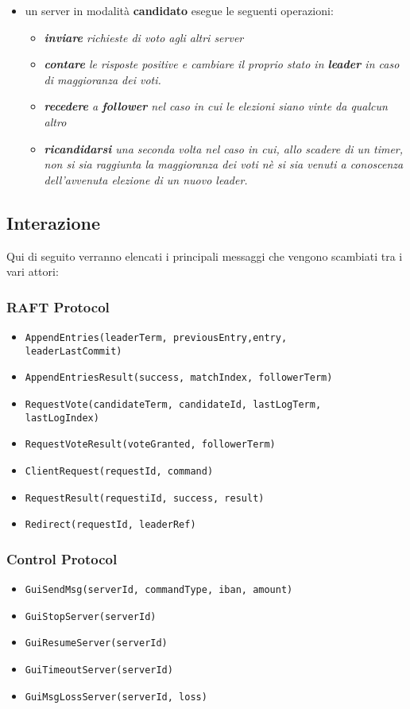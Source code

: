 \begin{itemize}
	\item un server in modalità \textbf{candidato} esegue le seguenti operazioni:
	\begin{itemize}
		\item \emph{\textbf{inviare} richieste di voto agli altri server}
		\item \emph{\textbf{contare} le risposte positive e cambiare il proprio stato in \textbf{leader} in caso di maggioranza dei voti.}
		\item \emph{\textbf{recedere} a \textbf{follower} nel caso in cui le elezioni siano vinte da qualcun altro}
		\item \emph{\textbf{ricandidarsi} una seconda volta nel caso in cui, allo scadere di un timer, non si sia raggiunta la maggioranza dei voti nè si sia venuti a conoscenza dell'avvenuta elezione di un nuovo leader.}			  		
	\end{itemize}
\end{itemize}


\subsection{Interazione}
Qui di seguito verranno elencati i principali messaggi che vengono scambiati tra i vari attori:

	\subsubsection{RAFT Protocol}
		\begin{itemize}
			\item{\texttt{AppendEntries(leaderTerm, previousEntry,entry,\\
			 leaderLastCommit) }}
			\item{\texttt{AppendEntriesResult(success, matchIndex, followerTerm) }}
			\item{\texttt{RequestVote(candidateTerm, candidateId, lastLogTerm,\\
			 lastLogIndex)}}
			\item{\texttt{RequestVoteResult(voteGranted, followerTerm)}}
			\item{\texttt{ClientRequest(requestId, command)}}
			\item{\texttt{RequestResult(requestiId, success, result)}}
			\item{\texttt{Redirect(requestId, leaderRef)}}
		\end{itemize}

	\subsubsection{Control Protocol}
		\begin{itemize}
			\item{\texttt{GuiSendMsg(serverId, commandType, iban, amount)}}
			\item{\texttt{GuiStopServer(serverId)}}
			\item{\texttt{GuiResumeServer(serverId)}}
			\item{\texttt{GuiTimeoutServer(serverId)}}
			\item{\texttt{GuiMsgLossServer(serverId, loss)}}
		\end{itemize}